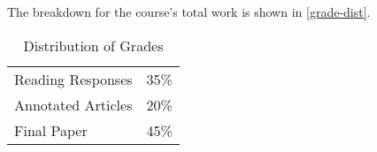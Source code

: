 \documentclass[titlepage]{article}
\newcommand\policy{../policy}
\begin{document}
The breakdown for the course's total work is shown in
\autoref{grade-dist}.

\begin{table}[htbp]
  \centering
  {\lining
  \begin{tabular}{lr}
    \toprule
    Reading Responses  & 35\% \\
    Annotated Articles & 20\% \\
    Final Paper        & 45\% \\
    \bottomrule
  \end{tabular}}
  \caption{Distribution of Grades}
  \label{grade-dist}
\end{table}



\end{document}
